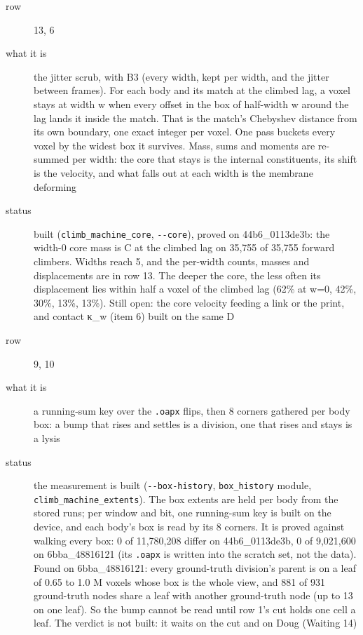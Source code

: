 \begin{description}
\item[{row}] 13, 6
\item[{what it is}] the jitter scrub, with B3 (every width, kept per width, and the jitter between frames). For each body and its match at the climbed lag, a voxel stays at width w when every offset in the box of half-width w around the lag lands it inside the match. That is the match's Chebyshev distance from its own boundary, one exact integer per voxel. One pass buckets every voxel by the widest box it survives. Mass, sums and moments are re-summed per width: the core that stays is the internal constituents, its shift is the velocity, and what falls out at each width is the membrane deforming
\item[{status}] built (\texttt{climb\_\allowbreak{}machine\_\allowbreak{}core}, \texttt{-\allowbreak{}-\allowbreak{}core}), proved on 44b6\_\allowbreak{}0113de3b: the width-0 core mass is C at the climbed lag on 35,755 of 35,755 forward climbers. Widths reach 5, and the per-width counts, masses and displacements are in row 13. The deeper the core, the less often its displacement lies within half a voxel of the climbed lag (62\% at w=0, 42\%, 30\%, 13\%, 13\%). Still open: the core velocity feeding a link or the print, and contact κ\_\allowbreak{}w (item 6) built on the same D
\end{description}

\begin{description}
\item[{row}] 9, 10
\item[{what it is}] a running-sum key over the \texttt{.\allowbreak{}oapx} flips, then 8 corners gathered per body box: a bump that rises and settles is a division, one that rises and stays is a lysis
\item[{status}] the measurement is built (\texttt{-\allowbreak{}-\allowbreak{}box-\allowbreak{}history}, \texttt{box\_\allowbreak{}history} module, \texttt{climb\_\allowbreak{}machine\_\allowbreak{}extents}). The box extents are held per body from the stored runs; per window and bit, one running-sum key is built on the device, and each body's box is read by its 8 corners. It is proved against walking every box: 0 of 11,780,208 differ on 44b6\_\allowbreak{}0113de3b, 0 of 9,021,600 on 6bba\_\allowbreak{}48816121 (its \texttt{.\allowbreak{}oapx} is written into the scratch set, not the data). Found on 6bba\_\allowbreak{}48816121: every ground-truth division's parent is on a leaf of 0.65 to 1.0 M voxels whose box is the whole view, and 881 of 931 ground-truth nodes share a leaf with another ground-truth node (up to 13 on one leaf). So the bump cannot be read until row 1's cut holds one cell a leaf. The verdict is not built: it waits on the cut and on Doug (Waiting 14)
\end{description}

